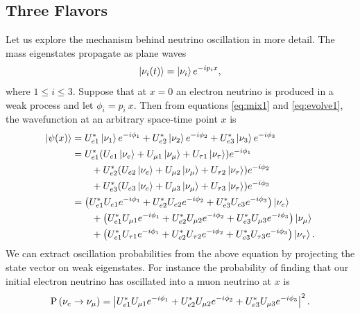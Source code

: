 \subsection{Three Flavors}
Let us explore the mechanism behind neutrino oscillation in more detail.
The mass eigenstates propagate as plane waves
\begin{equation}
  \label{eq:evolve1}
  \ket{\nu_i(t)}=\ket{\nu_i}e^{-ip_ix},
\end{equation}
where $1\leq i\leq3$. Suppose that at $x=0$ an electron neutrino
is produced in a weak process and let $\phi_i=p_i~x$. Then from equations
\eqref{eq:mix1} and \eqref{eq:evolve1}, the wavefunction at an arbitrary
space-time point $x$ is
\begin{equation}
  \begin{aligned}
    \ket{\psi(x)}&=U_{e1}^*\ket{\nu_1}e^{-i\phi_1}
                  +U_{e2}^*\ket{\nu_2}e^{-i\phi_2}
                  +U_{e3}^*\ket{\nu_3}e^{-i\phi_3} \\
                 &=U_{e1}^*(U_{e1}\ket{\nu_e}+U_{\mu 1}\ket{\nu_\mu}
                   +U_{\tau 1}\ket{\nu_\tau})e^{-i\phi_1} \\
                 &~~~~~~
                  +U_{e2}^*(U_{e2}\ket{\nu_e}+U_{\mu 2}\ket{\nu_\mu}
                   +U_{\tau 2}\ket{\nu_\tau})e^{-i\phi_2} \\
                 &~~~~~~
                  +U_{e3}^*(U_{e3}\ket{\nu_e}+U_{\mu 3}\ket{\nu_\mu}
                   +U_{\tau 3}\ket{\nu_\tau})e^{-i\phi_3} \\
                 &=\left(U_{e1}^*U_{e1}e^{-i\phi_1}
                    +U_{e2}^*U_{e2}e^{-i\phi_2}
                    +U_{e3}^*U_{e3}e^{-i\phi_3}\right)\ket{\nu_e} \\
                 &~~~~~~
                   +\left(U_{e1}^*U_{\mu 1}e^{-i\phi_1}
                    +U_{e2}^*U_{\mu 2}e^{-i\phi_2}
                    +U_{e3}^*U_{\mu 3}e^{-i\phi_3}\right)\ket{\nu_\mu} \\
                 &~~~~~~
                   +\left(U_{e1}^*U_{\tau 1}e^{-i\phi_1}
                    +U_{e2}^*U_{\tau 2}e^{-i\phi_2}
                    +U_{e3}^*U_{\tau 3}e^{-i\phi_3}\right)\ket{\nu_\tau}.
  \end{aligned}
\end{equation}
We can extract oscillation probabilities from the above equation by projecting
the state vector on weak eigenstates. For instance the probability of finding
that our initial electron neutrino has oscillated into a muon neutrino at $x$ is
\begin{equation}
  \operatorname{P}\left(\nu_e\to\nu_\mu\right)=\left|U_{e1}^*U_{\mu 1}e^{-i\phi_1}
                    +U_{e2}^*U_{\mu 2}e^{-i\phi_2}
                    +U_{e3}^*U_{\mu 3}e^{-i\phi_3}\right|^2.
\end{equation}
